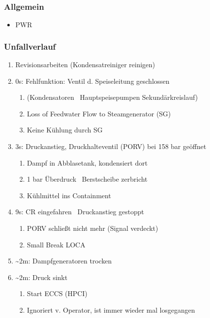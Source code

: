 \documentclass[12pt]{article}
\begin{document}
\subsubsection{Allgemein}
\begin{itemize}
	\item PWR
\end{itemize}

\subsubsection{Unfallverlauf}
\begin{enumerate}
	\item Revisionsarbeiten (Kondensatreiniger reinigen)
	\item 0s: Fehlfunktion: Ventil d. Speiseleitung geschlossen
		\begin{enumerate}[label = \textrightarrow]
			\item (Kondensatoren \textrightarrow\ Hauptspeisepumpen Sekundärkreislauf)
			\item Loss of Feedwater Flow to Steamgenerator (SG)
			\item Keine Kühlung durch SG
		\end{enumerate}
	\item 3s: Druckanstieg, Druckhalteventil (PORV) bei 158 bar geöffnet
		\begin{enumerate}[label = \textrightarrow]
			\item Dampf in Abblasetank, kondensiert dort
			\item 1 bar Überdruck \textrightarrow\ Berstscheibe zerbricht
			\item Kühlmittel ins Containment
		\end{enumerate}
	\item 9s: CR eingefahren \textrightarrow\ Druckanstieg gestoppt
		\begin{enumerate}[label = \textrightarrow]
			\item PORV schließt nicht mehr (Signal verdeckt)
			\item Small Break LOCA
		\end{enumerate}
	\item \textasciitilde 2m: Dampfgeneratoren trocken
	\item \textasciitilde 2m: Druck sinkt
		\begin{enumerate}[label = \textrightarrow]
			\item Start ECCS (HPCI)
			\item Ignoriert v. Operator, ist immer wieder mal losgegangen

\end{enumerate}
\end{enumerate}
\end{document}
